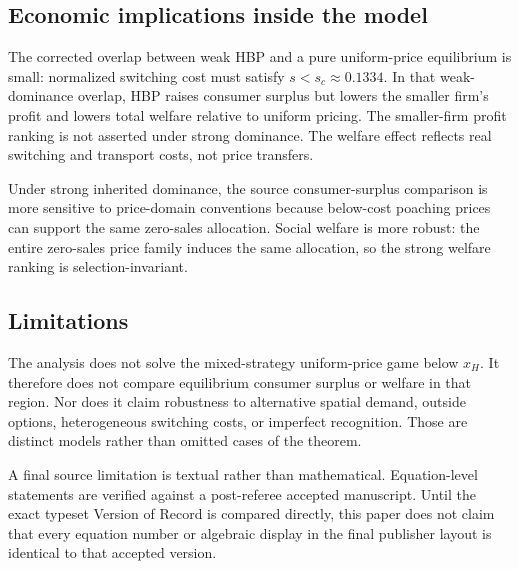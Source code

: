 \subsection{Economic implications inside the model}

The corrected overlap between weak HBP and a pure uniform-price equilibrium is small: normalized switching cost must satisfy \(s<s_c\approx0.1334\). In that weak-dominance overlap, HBP raises consumer surplus but lowers the smaller firm's profit and lowers total welfare relative to uniform pricing. The smaller-firm profit ranking is not asserted under strong dominance. The welfare effect reflects real switching and transport costs, not price transfers.

Under strong inherited dominance, the source consumer-surplus comparison is more sensitive to price-domain conventions because below-cost poaching prices can support the same zero-sales allocation. Social welfare is more robust: the entire zero-sales price family induces the same allocation, so the strong welfare ranking is selection-invariant.

\subsection{Limitations}

The analysis does not solve the mixed-strategy uniform-price game below \(x_H\). It therefore does not compare equilibrium consumer surplus or welfare in that region. Nor does it claim robustness to alternative spatial demand, outside options, heterogeneous switching costs, or imperfect recognition. Those are distinct models rather than omitted cases of the theorem.

A final source limitation is textual rather than mathematical. Equation-level statements are verified against a post-referee accepted manuscript. Until the exact typeset Version of Record is compared directly, this paper does not claim that every equation number or algebraic display in the final publisher layout is identical to that accepted version.
